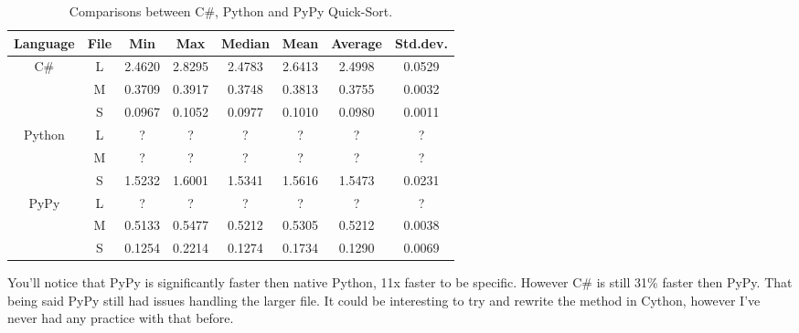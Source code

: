 \begin{table}[H]
\centering
\small
    \begin{tabular}{|c|c|c|c|c|c|c|c|} 
    \hline
        Language & File & Min & Max & Median & Mean & Average & Std.dev.\\
    \hline
        \multirow{3}{4em}{C\#} & L & 2.4620 & 2.8295 & 2.4783 & 2.6413 & 2.4998 & 0.0529 \\ 
        & M & 0.3709 & 0.3917 & 0.3748 & 0.3813 & 0.3755 & 0.0032 \\ 
        & S & 0.0967 & 0.1052 & 0.0977 & 0.1010 & 0.0980 & 0.0011 \\ 
    \hline
        \multirow{3}{4em}{Python} & L & ? & ? & ? & ? & ? & ? \\ 
        & M & ? & ? & ? & ? & ? & ? \\ 
        & S & 1.5232 & 1.6001 & 1.5341 & 1.5616 & 1.5473 & 0.0231 \\
    \hline
        \multirow{3}{4em}{PyPy} & L & ? & ? & ? & ? & ? & ? \\ 
        & M & 0.5133 & 0.5477 & 0.5212 & 0.5305 & 0.5212 &  0.0038 \\ 
        & S & 0.1254 & 0.2214 & 0.1274 & 0.1734 & 0.1290 & 0.0069 \\ 
    \hline
\end{tabular}
\vspace*{-0.3cm}
\caption{\label{tab:table-comparison_m}Comparisons between C\#, Python and PyPy Quick-Sort.}
\end{table}

\noindent You'll notice that PyPy is significantly faster then native Python, 11x faster to be specific. However C\# is still 31\% faster then PyPy. That being said PyPy still had issues handling the larger file. It could be interesting to try and rewrite the method in Cython, however I've never had any practice with that before.